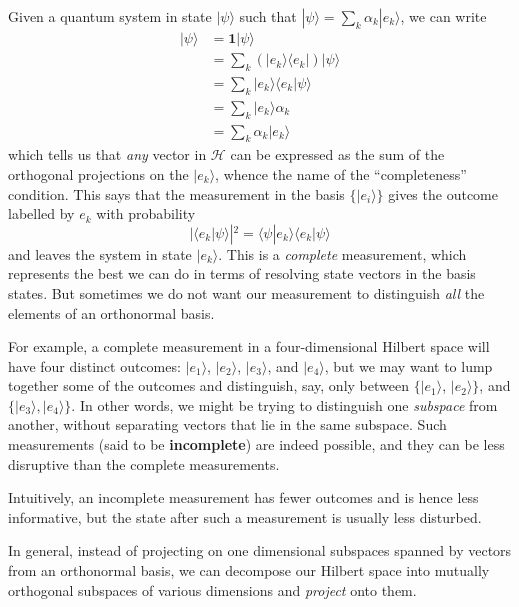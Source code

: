 \documentclass[fleqn]{article}
\newenvironment{idea}{\noindent}{\medskip}
\begin{document}
Given a quantum system in state \(|\psi\rangle\) such that \(|\psi\rangle = \sum_k \alpha_k|e_k\rangle\), we can write
\[
  \begin{aligned}
    |\psi\rangle
    &= \mathbf{1}|\psi\rangle
  \\&= \sum_k (|e_k\rangle\langle e_k|) |\psi\rangle
  \\&= \sum_k |e_k\rangle\langle e_k|\psi\rangle
  \\&= \sum_k |e_k\rangle\alpha_k
  \\&= \sum_k \alpha_k|e_k\rangle
  \end{aligned}
\]
which tells us that \emph{any} vector in \(\mathcal{H}\) can be expressed as the sum of the orthogonal projections on the \(|e_k\rangle\), whence the name of the ``completeness'' condition.
This says that the measurement in the basis \(\{|e_i\rangle\}\) gives the outcome labelled by \(e_k\) with probability
\[
  |\langle e_k|\psi\rangle|^2 = \langle\psi|e_k\rangle\langle e_k|\psi\rangle
\]
and leaves the system in state \(|e_k\rangle\).
This is a \emph{complete} measurement, which represents the best we can do in terms of resolving state vectors in the basis states.
But sometimes we do not want our measurement to distinguish \emph{all} the elements of an orthonormal basis.

For example, a complete measurement in a four-dimensional Hilbert space will have four distinct outcomes: \(|e_1\rangle\), \(|e_2\rangle\), \(|e_3\rangle\), and \(|e_4\rangle\), but we may want to lump together some of the outcomes and distinguish, say, only between \(\{|e_1\rangle\), \(|e_2\rangle\}\), and \(\{|e_3\rangle,|e_4\rangle\}\).
In other words, we might be trying to distinguish one \emph{subspace} from another, without separating vectors that lie in the same subspace.
Such measurements (said to be \textbf{incomplete}) are indeed possible, and they can be less disruptive than the complete measurements.

\begin{idea}
Intuitively, an incomplete measurement has fewer outcomes and is hence less informative, but the state after such a measurement is usually less disturbed.

\end{idea}

In general, instead of projecting on one dimensional subspaces spanned by vectors from an orthonormal basis, we can decompose our Hilbert space into mutually orthogonal subspaces of various dimensions and \emph{project} onto them.
\end{document}
